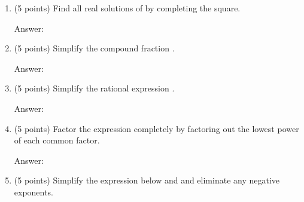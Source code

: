 \documentclass[12pt]{article}
\begin{document}
\newpage
\begin{enumerate}
\item (5 points) Find all real solutions of \scalebox{1.2}{$ 3x^2-4x-6=0$} by completing the square.\\

\begin{flushright}{ Answer:\underline{\hspace{2in}}}\end{flushright}
\vfill
\item (5 points) Simplify the compound fraction .
\begin{flushright}{ Answer:\underline{\hspace{2in}}}\end{flushright}
\vfill
\item (5 points) Simplify the rational expression .
\begin{flushright}{ Answer:\underline{\hspace{2in}}}\end{flushright}
\vfill
\item (5 points) Factor the expression  completely by factoring out the lowest power of each common factor.
\begin{flushright}{ Answer:\underline{\hspace{2in}}}\end{flushright}
\vfill
\newpage


\item (5 points) Simplify the expression below and  and eliminate any negative exponents.\\


\end{enumerate}
\end{document}
